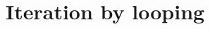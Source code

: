 \documentclass[a4paper,11pt]{article}
\begin{document}
% 
% 
% 
% 
% 
% 
% 
% 
% 
% 

\section{Iteration by looping}
\end{document}
